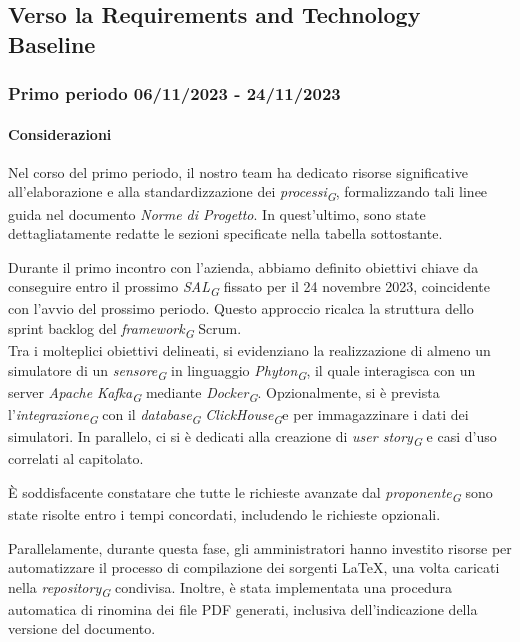 \subsection{Verso la Requirements and Technology Baseline}
\subsubsection{Primo periodo  06/11/2023 - 24/11/2023}
\paragraph{Considerazioni}
    Nel corso del primo periodo, il nostro team ha dedicato risorse significative all'elaborazione e alla standardizzazione dei \textit{processi}\textsubscript{\textit{G}}, formalizzando tali linee guida nel documento \textit{Norme di Progetto}. In quest'ultimo, sono state dettagliatamente redatte le sezioni specificate nella tabella sottostante.

    \vspace{0.2cm}

    Durante il primo incontro con l'azienda, abbiamo definito obiettivi chiave da conseguire entro il prossimo \textit{SAL}\textsubscript{\textit{G}} fissato per il 24 novembre 2023, coincidente con l'avvio del prossimo periodo. Questo approccio ricalca la struttura dello sprint backlog del \textit{framework}\textsubscript{\textit{G}} Scrum. \\
    Tra i molteplici obiettivi delineati, si evidenziano la realizzazione di almeno un simulatore di un \textit{sensore}\textsubscript{\textit{G}} in linguaggio \textit{Phyton}\textsubscript{\textit{G}}, il quale interagisca con un server \textit{Apache Kafka}\textsubscript{\textit{G}} mediante \textit{Docker}\textsubscript{\textit{G}}. Opzionalmente, si è prevista l'\textit{integrazione}\textsubscript{\textit{G}} con il \textit{database}\textsubscript{\textit{G}} \textit{ClickHouse}\textsubscript{\textit{G}}e per immagazzinare i dati dei simulatori. In parallelo, ci si è dedicati alla creazione di \textit{user story}\textsubscript{\textit{G}} e casi d'uso correlati al capitolato.

    \vspace{0.2cm}

    È soddisfacente constatare che tutte le richieste avanzate dal \textit{proponente}\textsubscript{\textit{G}} sono state risolte entro i tempi concordati, includendo le richieste opzionali.

    Parallelamente, durante questa fase, gli amministratori hanno investito risorse per automatizzare il processo di compilazione dei sorgenti \LaTeX, una volta caricati nella \textit{repository}\textsubscript{\textit{G}} condivisa. Inoltre, è stata implementata una procedura automatica di rinomina dei file PDF generati, inclusiva dell'indicazione della versione del documento.

